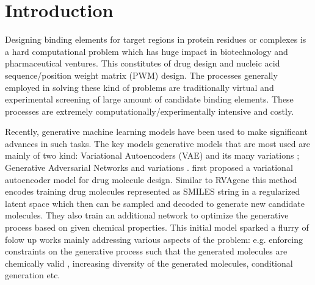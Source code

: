 \section{Introduction} 

Designing binding elements for target regions in protein residues or complexes is a hard
computational problem  which has huge impact in biotechnology and pharmaceutical ventures.
This constitutes of drug design and nucleic acid sequence/position weight matrix (PWM)
design. The processes generally employed in solving these kind of problems are traditionally virtual and
experimental screening of large amount of candidate binding elements. These processes are extremely
computationally/experimentally intensive and costly. 
\par
Recently, generative machine learning models have
been used to make significant advances in such tasks. The key models generative models that are most
used are mainly of two kind: Variational Autoencoders (VAE) \citep{Kingma2014} and its many
variations \citep{higgins2016beta, sohn2015learning,dilokthanakul2016deep}; Generative Adversarial
Networks \citep{goodfellow2014generative} and variations \citep{wang2018high,zhu2017unpaired}.
\citet{gomez2018automatic} first proposed a variational autoencoder model for drug molecule design.
Similar to RVAgene  this method encodes training drug molecules represented as SMILES
\citep{weininger1988smiles} string in a regularized latent space which then can be sampled and
decoded to generate new candidate molecules. They also train an additional network to optimize the
generative process based on given chemical properties. This initial model sparked a flurry of folow up 
works mainly addressing various aspects of the problem: e.g. enforcing constraints on the generative process 
such that the generated molecules are chemically valid \citet{kusner2017grammar}, increasing diversity of the generated
molecules, conditional generation etc. 

